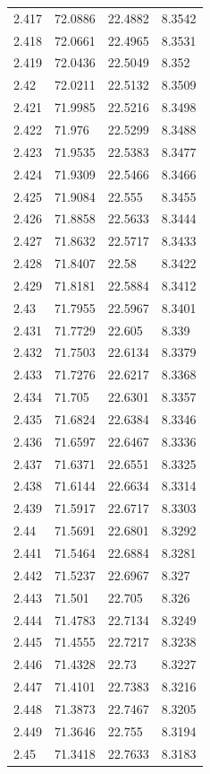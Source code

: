 \begin{tabular}{llll}
2.417 & 72.0886 & 22.4882 & 8.3542 \\
2.418 & 72.0661 & 22.4965 & 8.3531 \\
2.419 & 72.0436 & 22.5049 & 8.352 \\
2.42 & 72.0211 & 22.5132 & 8.3509 \\
2.421 & 71.9985 & 22.5216 & 8.3498 \\
2.422 & 71.976 & 22.5299 & 8.3488 \\
2.423 & 71.9535 & 22.5383 & 8.3477 \\
2.424 & 71.9309 & 22.5466 & 8.3466 \\
2.425 & 71.9084 & 22.555 & 8.3455 \\
2.426 & 71.8858 & 22.5633 & 8.3444 \\
2.427 & 71.8632 & 22.5717 & 8.3433 \\
2.428 & 71.8407 & 22.58 & 8.3422 \\
2.429 & 71.8181 & 22.5884 & 8.3412 \\
2.43 & 71.7955 & 22.5967 & 8.3401 \\
2.431 & 71.7729 & 22.605 & 8.339 \\
2.432 & 71.7503 & 22.6134 & 8.3379 \\
2.433 & 71.7276 & 22.6217 & 8.3368 \\
2.434 & 71.705 & 22.6301 & 8.3357 \\
2.435 & 71.6824 & 22.6384 & 8.3346 \\
2.436 & 71.6597 & 22.6467 & 8.3336 \\
2.437 & 71.6371 & 22.6551 & 8.3325 \\
2.438 & 71.6144 & 22.6634 & 8.3314 \\
2.439 & 71.5917 & 22.6717 & 8.3303 \\
2.44 & 71.5691 & 22.6801 & 8.3292 \\
2.441 & 71.5464 & 22.6884 & 8.3281 \\
2.442 & 71.5237 & 22.6967 & 8.327 \\
2.443 & 71.501 & 22.705 & 8.326 \\
2.444 & 71.4783 & 22.7134 & 8.3249 \\
2.445 & 71.4555 & 22.7217 & 8.3238 \\
2.446 & 71.4328 & 22.73 & 8.3227 \\
2.447 & 71.4101 & 22.7383 & 8.3216 \\
2.448 & 71.3873 & 22.7467 & 8.3205 \\
2.449 & 71.3646 & 22.755 & 8.3194 \\
2.45 & 71.3418 & 22.7633 & 8.3183 \\

\end{tabular}
